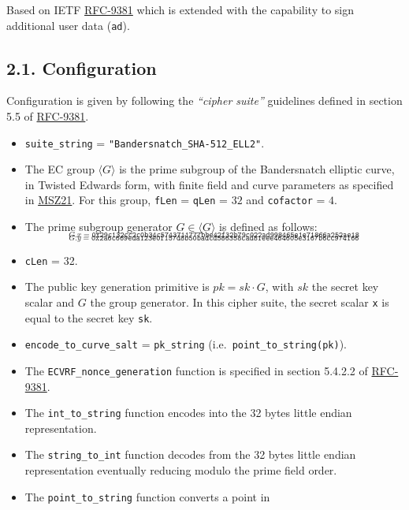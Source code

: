 \documentclass[
]{article}
\begin{document}
Based on IETF \href{https://datatracker.ietf.org/doc/rfc9381}{RFC-9381}
which is extended with the capability to sign additional user data
(\texttt{ad}).

\hypertarget{configuration}{%
\subsection{2.1. Configuration}\label{configuration}}

Configuration is given by following the \emph{``cipher suite''}
guidelines defined in section 5.5 of
\href{https://datatracker.ietf.org/doc/rfc9381}{RFC-9381}.

\begin{itemize}
\item
  \texttt{suite\_string} = \texttt{"Bandersnatch\_SHA-512\_ELL2"}.
\item
  The EC group \(\langle G \rangle\) is the prime subgroup of the
  Bandersnatch elliptic curve, in Twisted Edwards form, with finite
  field and curve parameters as specified in
  \href{https://eprint.iacr.org/2021/1152}{MSZ21}. For this group,
  \texttt{fLen} = \texttt{qLen} = \(32\) and \texttt{cofactor} = \(4\).
\item
  The prime subgroup generator \(G \in \langle G \rangle\) is defined as
  follows:
  \[_{G.x = \texttt{0x29c132cc2c0b34c5743711777bbe42f32b79c022ad998465e1e71866a252ae18}}\]
  \[_{G.y = \texttt{0x2a6c669eda123e0f157d8b50badcd586358cad81eee464605e3167b6cc974166}}\]
\item
  \texttt{cLen} = 32.
\item
  The public key generation primitive is \(pk = sk \cdot G\), with
  \(sk\) the secret key scalar and \(G\) the group generator. In this
  cipher suite, the secret scalar \texttt{x} is equal to the secret key
  \texttt{sk}.
\item
  \texttt{encode\_to\_curve\_salt} = \texttt{pk\_string}
  (i.e.~\texttt{point\_to\_string(pk)}).
\item
  The \texttt{ECVRF\_nonce\_generation} function is specified in section
  5.4.2.2 of \href{https://datatracker.ietf.org/doc/rfc9381}{RFC-9381}.
\item
  The \texttt{int\_to\_string} function encodes into the 32 bytes little
  endian representation.
\item
  The \texttt{string\_to\_int} function decodes from the 32 bytes little
  endian representation eventually reducing modulo the prime field
  order.
\item
  The \texttt{point\_to\_string} function converts a point in

\end{itemize}
\end{document}
